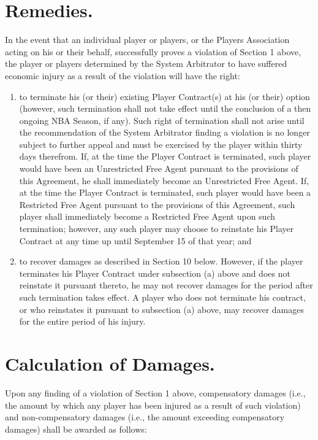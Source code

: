 \documentclass[
]{book}
\providecommand{\tightlist}{%
  \setlength{\itemsep}{0pt}\setlength{\parskip}{0pt}}
\begin{document}
\hypertarget{remedies.}{%
\section{Remedies.}\label{remedies.}}

In the event that an individual player or players, or the Players Association acting on his or their behalf, successfully proves a violation of Section 1 above, the player or players determined by the System Arbitrator to have suffered economic injury as a result of the violation will have the right:

\begin{enumerate}
\def\labelenumi{(\alph{enumi})}
\tightlist
\item
  to terminate his (or their) existing Player Contract(s) at his (or their) option (however, such termination shall not take effect until the conclusion of a then ongoing NBA Season, if any). Such right of termination shall not arise until the recommendation of the System Arbitrator finding a violation is no longer subject to further appeal and must be exercised by the player within thirty days therefrom. If, at the time the Player Contract is terminated, such player would have been an Unrestricted Free Agent pursuant to the provisions of this Agreement, he shall immediately become an Unrestricted Free Agent. If, at the time the Player Contract is terminated, such player would have been a Restricted Free Agent pursuant to the provisions of this Agreement, such player shall immediately become a Restricted Free Agent upon such termination; however, any such player may choose to reinstate his Player Contract at any time up until September 15 of that year; and
\item
  to recover damages as described in Section 10 below. However, if the player terminates his Player Contract under subsection (a) above and does not reinstate it pursuant thereto, he may not recover damages for the period after such termination takes effect. A player who does not terminate his contract, or who reinstates it pursuant to subsection (a) above, may recover damages for the entire period of his injury.
\end{enumerate}

\hypertarget{calculation-of-damages.}{%
\section{Calculation of Damages.}\label{calculation-of-damages.}}

Upon any finding of a violation of Section 1 above, compensatory damages (i.e., the amount by which any player has been injured as a result of such violation) and non-compensatory damages (i.e., the amount exceeding compensatory damages) shall be awarded as follows:
\end{document}
